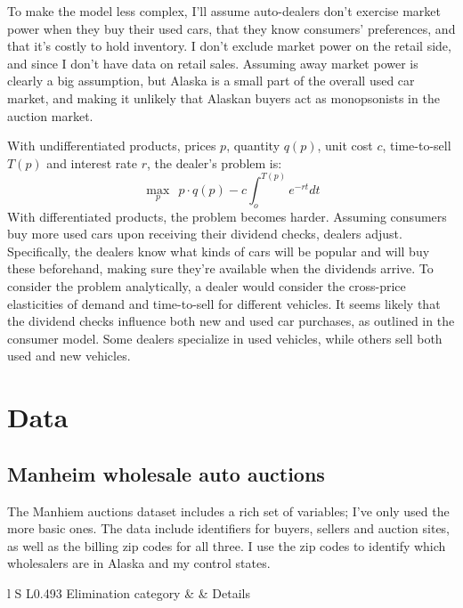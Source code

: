 \documentclass[11pt,letterpaper,oneside]{article}
\begin{document}
\begin{doublespacing}
To make the model less complex, I'll assume auto\hyp{}dealers don't exercise market power when they buy their used cars, that they know consumers' preferences, and that it's costly to hold inventory.
I don't exclude market power on the retail side, and since I don't have data on retail sales.
Assuming away market power is clearly a big assumption, but Alaska is a small part of the overall used car market, and making it unlikely that Alaskan buyers act as monopsonists in the auction market.

With undifferentiated products, prices $p$, quantity $q(p)$, unit cost $c$, time-to-sell $T(p)$ and interest rate $r$, the dealer's problem is:
\[
\max_p \ \ p \cdot q(p) - c \int_o^{T(p)} e^{-rt}dt
\]
With differentiated products, the problem becomes harder.
Assuming consumers buy more used cars upon receiving their dividend checks, dealers adjust.
Specifically, the dealers know what kinds of cars will be popular and will buy these beforehand, making sure they're available when the dividends arrive.
To consider the problem analytically, a dealer would consider the cross-price elasticities of demand and time-to-sell for different vehicles.
It seems likely that  the dividend checks influence both new and used car purchases, as outlined in the consumer model.
Some dealers specialize in used vehicles, while others sell both used and new vehicles.



\section{Data}
\label{sec:data}

\subsection{Manheim wholesale auto auctions}
\label{sec:manheim-data}


The Manhiem auctions dataset includes a rich set of variables; I've only used the more basic ones.
The data include identifiers for buyers, sellers and auction sites, as well as the billing zip codes for all three.
I use the zip codes to identify which wholesalers are in Alaska and my control states.

\begin{table}[!hbt]
    \caption{Cleaning Manheim auction data}
    \label{tab:cleaning_manheim}
\begin{tabular}{l S L{0.493\linewidth}}
    \toprule
	Elimination category &  & Details\\
	\midrule


\end{tabular}
\end{table}
\end{doublespacing}
\end{document}
